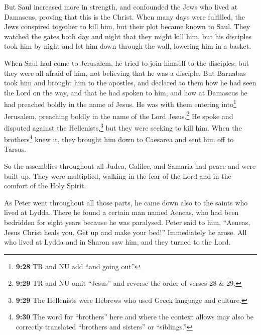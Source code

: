  But Saul increased more in strength, and confounded the
Jews who lived at Damascus, proving that this is the Christ.
 When many days were fulfilled, the Jews conspired
together to kill him,  but their plot became known to
Saul. They watched the gates both day and night that they might kill
him,  but his disciples took him by night and let him
down through the wall, lowering him in a basket.

 When Saul had come to Jerusalem, he tried to join
himself to the disciples; but they were all afraid of him, not believing
that he was a disciple.  But Barnabas took him and
brought him to the apostles, and declared to them how he had seen the
Lord on the way, and that he had spoken to him, and how at Damascus he
had preached boldly in the name of Jesus.  He was with
them entering into\footnote{\textbf{9:28} TR and NU add ``and going
  out''} Jerusalem,  preaching boldly in the name of the
Lord Jesus.\footnote{\textbf{9:29} TR and NU omit ``Jesus'' and reverse
  the order of verses 28 \& 29.} He spoke and disputed against the
Hellenists,\footnote{\textbf{9:29} The Hellenists were Hebrews who used
  Greek language and culture.} but they were seeking to kill him.
 When the brothers\footnote{\textbf{9:30} The word for
  ``brothers'' here and where the context allows may also be correctly
  translated ``brothers and sisters'' or ``siblings.''} knew it, they
brought him down to Caesarea and sent him off to Tarsus.

 So the assemblies throughout all Judea, Galilee, and
Samaria had peace and were built up. They were multiplied, walking in
the fear of the Lord and in the comfort of the Holy Spirit.

 As Peter went throughout all those parts, he came down
also to the saints who lived at Lydda.  There he found a
certain man named Aeneas, who had been bedridden for eight years because
he was paralysed.  Peter said to him, ``Aeneas, Jesus
Christ heals you. Get up and make your bed!'' Immediately he arose.
 All who lived at Lydda and in Sharon saw him, and they
turned to the Lord.

